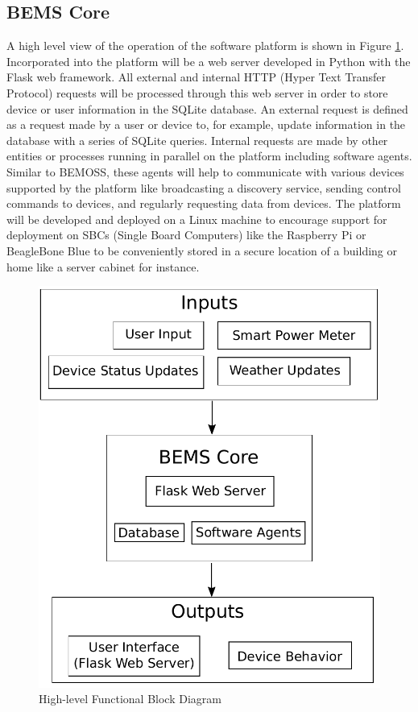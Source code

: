 \documentclass[letterpaper,12pt]{article}   %
\begin{document}
\subsection{BEMS Core}
A high level view of the operation of the software platform is shown in Figure \ref{fig:functionalBlockDiagram}. Incorporated into the platform will be a web server developed in Python with the Flask web framework. All external and internal HTTP (Hyper Text Transfer Protocol) requests will be processed through this web server in order to store device or user information in the SQLite database. An external request is defined as a request made by a user or device to, for example, update information in the database with a series of SQLite queries. Internal requests are made by other entities or processes running in parallel on the platform including software agents. Similar to BEMOSS, these agents will help to communicate with various devices supported by the platform like broadcasting a discovery service, sending control commands to devices, and regularly requesting data from devices. The platform will be developed and deployed on a Linux machine to encourage support for deployment on SBCs (Single Board Computers) like the Raspberry Pi or BeagleBone Blue to be conveniently stored in a secure location of a building or home like a server cabinet for instance.
\begin{figure}[H]
    \centering
    \includegraphics[scale=0.4]{figs/functionalBlockDiagram}
    \caption{High-level Functional Block Diagram}
    \label{fig:functionalBlockDiagram}
\end{figure}
\end{document}
